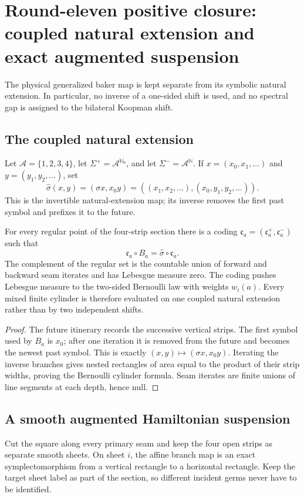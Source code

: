 \section{Round-eleven positive closure: coupled natural extension and exact augmented suspension}
\label{sec:r11-a1}

The physical generalized baker map is kept separate from its symbolic natural
extension.  In particular, no inverse of a one-sided shift is used, and no
spectral gap is assigned to the bilateral Koopman shift.

\subsection{The coupled natural extension}
Let $\mathcal A=\{1,2,3,4\}$, let
$\Sigma^+=\mathcal A^{\mathbb N_0}$, and let
$\Sigma^-=\mathcal A^{\mathbb N}$.  If
$x=(x_0,x_1,\ldots)$ and $y=(y_1,y_2,\ldots)$, set
\[
 \widehat\sigma(x,y)=(\sigma x,x_0y)
 =((x_1,x_2,\ldots),(x_0,y_1,y_2,\ldots)).
\]
This is the invertible natural-extension map; its inverse removes the first
past symbol and prefixes it to the future.

\begin{theorem}
\label{thm:r11-a1-factor}
For every regular point of the four-strip section there is a coding
$\mathfrak c_a=(\mathfrak c_a^+,\mathfrak c_a^-)$ such that
\[
 \mathfrak c_a\circ B_a=\widehat\sigma\circ\mathfrak c_a.
\]
The complement of the regular set is the countable union of forward and
backward seam iterates and has Lebesgue measure zero.  The coding pushes
Lebesgue measure to the two-sided Bernoulli law with weights $w_i(a)$.
Every mixed finite cylinder is therefore evaluated on one coupled natural
extension rather than by two independent shifts.
\end{theorem}

\begin{proof}
The future itinerary records the successive vertical strips.  The first
symbol used by $B_a$ is $x_0$; after one iteration it is removed from the
future and becomes the newest past symbol.  This is exactly
$(x,y)\mapsto(\sigma x,x_0y)$.  Iterating the inverse branches gives nested
rectangles of area equal to the product of their strip widths, proving the
Bernoulli cylinder formula.  Seam iterates are finite unions of line segments
at each depth, hence null.
\end{proof}

\subsection{A smooth augmented Hamiltonian suspension}
Cut the square along every primary seam and keep the four open strips as
separate smooth sheets.  On sheet $i$, the affine branch map is an exact
symplectomorphism from a vertical rectangle to a horizontal rectangle.  Keep
the target sheet label as part of the section, so different incident germs
never have to be identified.

